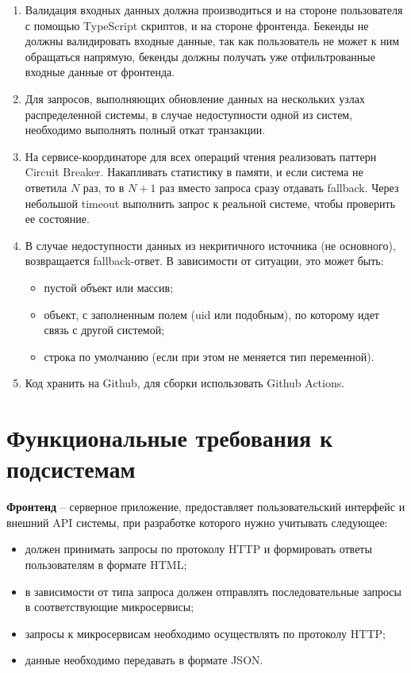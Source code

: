 \begin{enumerate}
	\item  Валидация входных данных должна производиться и на стороне пользователя с помощью TypeScript скриптов, и на стороне фронтенда. Бекенды не должны валидировать входные данные, так как пользователь не может к ним обращаться напрямую, бекенды должны получать уже отфильтрованные входные данные от фронтенда.
	
	\item  Для запросов, выполняющих обновление данных на нескольких узлах распределенной системы, в случае недоступности одной из систем, необходимо выполнять полный откат транзакции.
	
	\item  На сервисе-координаторе для всех операций чтения реализовать паттерн Circuit Breaker. Накапливать статистику в памяти, и если система не ответила $N$ раз, то в $N+1$ раз вместо запроса сразу отдавать fallback. Через небольшой timeout выполнить запрос к реальной системе, чтобы проверить ее состояние.
	
	\item  В случае недоступности данных из некритичного источника (не основного), возвращается fallback-ответ. В зависимости от ситуации, это может быть:
	\begin{itemize}
		\item пустой объект или массив;
		\item объект, с заполненным полем (uid или подобным), по которому
		идет связь с другой системой;
		\item строка по умолчанию (если при этом не меняется тип переменной).
	\end{itemize}
	
	\item  Код хранить на Github, для сборки использовать Github Actions.
\end{enumerate}

\section{Функциональные требования к подсистемам}

\textbf{Фронтенд} -- серверное  приложение, предоставляет пользовательский интерфейс и внешний API системы, при  разработке которого нужно учитывать следующее:
\begin{itemize}
	\item должен  принимать  запросы  по  протоколу  HTTP и формировать ответы пользователям в формате HTML;
	
	\item в зависимости от типа запроса должен отправлять последовательные запросы в соответствующие микросервисы;
	
	\item запросы к микросервисам необходимо осуществлять по протоколу HTTP;
	
	\item данные необходимо передавать в формате JSON.
\end{itemize}

